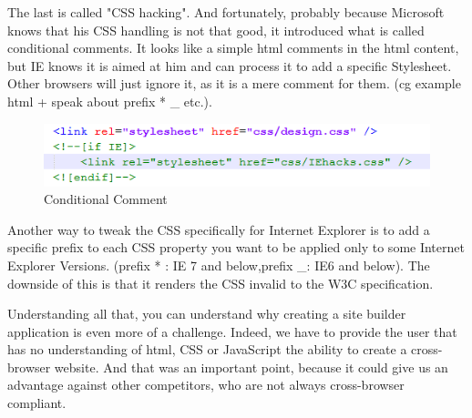 The last is called "CSS hacking". And fortunately, probably because Microsoft knows that his CSS handling is not that good, it introduced what is called conditional comments. It looks like a simple html comments in the html content, but IE knows it is aimed at him and can process it to add a specific Stylesheet. Other browsers will just ignore it, as it is a mere comment for them. (cg example html + speak about prefix * \_ etc.). 

\begin{figure}[!ht]
\centering
\includegraphics[width=.55\textwidth]{img/comments.png}
\caption{Conditional Comment}
\label{figure:conditional comment}
\end{figure}

Another way to tweak the CSS specifically for Internet Explorer is to add a specific prefix to each CSS property you want to be applied only to some Internet Explorer Versions. (prefix * : IE 7 and below,prefix \_: IE6 and below). The downside of this is that it renders the CSS invalid to the W3C specification.

Understanding all that, you can understand why creating a site builder application is even more of a challenge. Indeed, we have to provide the user that has no understanding of html, CSS or JavaScript the ability to create a cross-browser website. And that was an important point, because it could give us an advantage against other competitors, who are not always cross-browser compliant.
